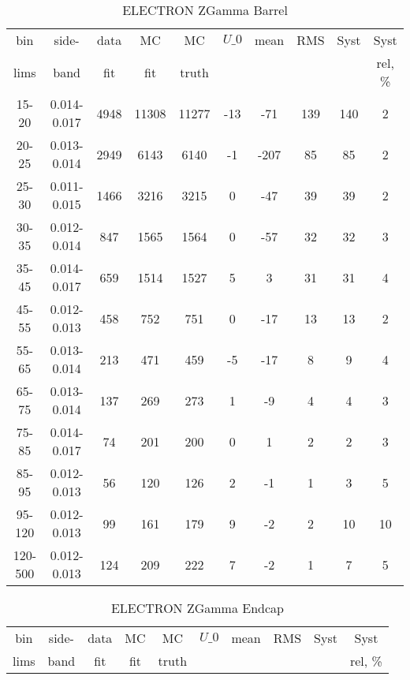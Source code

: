 \documentclass{beamer}
\begin{document}
\begin{frame}
\begin{table}[h]
  	\tiny
  \begin{center}
  \caption{ELECTRON ZGamma Barrel}
  \begin{tabular}{|c|c|c|c|c|c|c|c|c|c|}
    bin & side- & data & MC & MC    & $U\_{0}$ & mean & RMS & Syst & Syst \\ 
    lims & band & fit & fit & truth &       &      &     &      & rel, \% \\ \hline
    15-20 & 0.014-0.017 & 4948 & 11308 & 11277 & -13 & -71 & 139 & 140 & 2  \\ \hline
    20-25 & 0.013-0.014 & 2949 & 6143 & 6140 & -1 & -207 & 85 & 85 & 2  \\ \hline
    25-30 & 0.011-0.015 & 1466 & 3216 & 3215 & 0 & -47 & 39 & 39 & 2  \\ \hline
    30-35 & 0.012-0.014 & 847 & 1565 & 1564 & 0 & -57 & 32 & 32 & 3  \\ \hline
    35-45 & 0.014-0.017 & 659 & 1514 & 1527 & 5 & 3 & 31 & 31 & 4  \\ \hline
    45-55 & 0.012-0.013 & 458 & 752 & 751 & 0 & -17 & 13 & 13 & 2  \\ \hline
    55-65 & 0.013-0.014 & 213 & 471 & 459 & -5 & -17 & 8 & 9 & 4  \\ \hline
    65-75 & 0.013-0.014 & 137 & 269 & 273 & 1 & -9 & 4 & 4 & 3  \\ \hline
    75-85 & 0.014-0.017 & 74 & 201 & 200 & 0 & 1 & 2 & 2 & 3  \\ \hline
    85-95 & 0.012-0.013 & 56 & 120 & 126 & 2 & -1 & 1 & 3 & 5  \\ \hline
    95-120 & 0.012-0.013 & 99 & 161 & 179 & 9 & -2 & 2 & 10 & 10  \\ \hline
    120-500 & 0.012-0.013 & 124 & 209 & 222 & 7 & -2 & 1 & 7 & 5  \\ \hline
  \end{tabular}
  \label{tab:systSbVar_Meth1_ELECTRON_ZGamma_Barrel}
  \end{center}
\end{table}
\begin{table}[h]
  	\tiny
  \begin{center}
  \caption{ELECTRON ZGamma Endcap}
  \begin{tabular}{|c|c|c|c|c|c|c|c|c|c|}
    bin & side- & data & MC & MC    & $U\_{0}$ & mean & RMS & Syst & Syst \\ 
    lims & band & fit & fit & truth &       &      &     &      & rel, \% \\ \hline

\end{tabular}
\end{center}
\end{table}
\end{frame}
\end{document}
